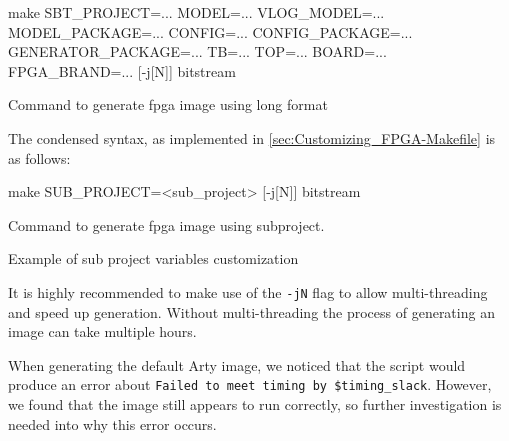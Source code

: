 \begin{listing}[h!tbp]
  \begin{bashsource}
    make SBT_PROJECT=... MODEL=... VLOG_MODEL=... MODEL_PACKAGE=... CONFIG=... CONFIG_PACKAGE=... GENERATOR_PACKAGE=... TB=... TOP=... BOARD=... FPGA_BRAND=... [-j[N]] bitstream
  \end{bashsource}
  \caption{Command to generate \Gls{fpga} image using long format}
  \label{lst:extended_fpga_cmd}
\end{listing}

The condensed syntax, as implemented in \cref{sec:Customizing_FPGA-Makefile} is as follows:

\begin{listing}[h!tbp]
  \begin{bashsource}
    make SUB_PROJECT=<sub_project> [-j[N]] bitstream
  \end{bashsource}
  \caption{Command to generate \Gls{fpga} image using subproject.}
  \label{lst:condensed_fpga_cmd}
\end{listing}

\begin{listing}[h!tbp]
	\caption{Example of sub project variables customization}
	\label{lst:$makefile_subproject_example}
\end{listing}

It is highly recommended to make use of the \texttt{-jN} flag to allow multi-threading and speed up generation.
Without multi-threading the process of generating an image can take multiple hours.

When generating the default Arty image, we noticed that the script would produce an error about \texttt{Failed to meet timing by \$timing\_slack}.
However, we found that the image still appears to run correctly, so further investigation is needed into why this error occurs.

